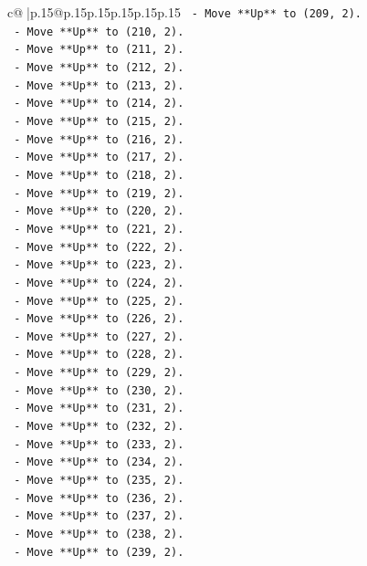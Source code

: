 \documentclass{article}
\begin{document}
{\begin{supertabular}{c@{$\;$}|p{.15\linewidth}@{}p{.15\linewidth}p{.15\linewidth}p{.15\linewidth}p{.15\linewidth}p{.15\linewidth}}
{{{\texttt{    {-} Move **Up** to (209, 2).} \\
\texttt{    {-} Move **Up** to (210, 2).} \\
\texttt{    {-} Move **Up** to (211, 2).} \\
\texttt{    {-} Move **Up** to (212, 2).} \\
\texttt{    {-} Move **Up** to (213, 2).} \\
\texttt{    {-} Move **Up** to (214, 2).} \\
\texttt{    {-} Move **Up** to (215, 2).} \\
\texttt{    {-} Move **Up** to (216, 2).} \\
\texttt{    {-} Move **Up** to (217, 2).} \\
\texttt{    {-} Move **Up** to (218, 2).} \\
\texttt{    {-} Move **Up** to (219, 2).} \\
\texttt{    {-} Move **Up** to (220, 2).} \\
\texttt{    {-} Move **Up** to (221, 2).} \\
\texttt{    {-} Move **Up** to (222, 2).} \\
\texttt{    {-} Move **Up** to (223, 2).} \\
\texttt{    {-} Move **Up** to (224, 2).} \\
\texttt{    {-} Move **Up** to (225, 2).} \\
\texttt{    {-} Move **Up** to (226, 2).} \\
\texttt{    {-} Move **Up** to (227, 2).} \\
\texttt{    {-} Move **Up** to (228, 2).} \\
\texttt{    {-} Move **Up** to (229, 2).} \\
\texttt{    {-} Move **Up** to (230, 2).} \\
\texttt{    {-} Move **Up** to (231, 2).} \\
\texttt{    {-} Move **Up** to (232, 2).} \\
\texttt{    {-} Move **Up** to (233, 2).} \\
\texttt{    {-} Move **Up** to (234, 2).} \\
\texttt{    {-} Move **Up** to (235, 2).} \\
\texttt{    {-} Move **Up** to (236, 2).} \\
\texttt{    {-} Move **Up** to (237, 2).} \\
\texttt{    {-} Move **Up** to (238, 2).} \\
\texttt{    {-} Move **Up** to (239, 2).} \\
}}}
\end{supertabular}}
\end{document}
